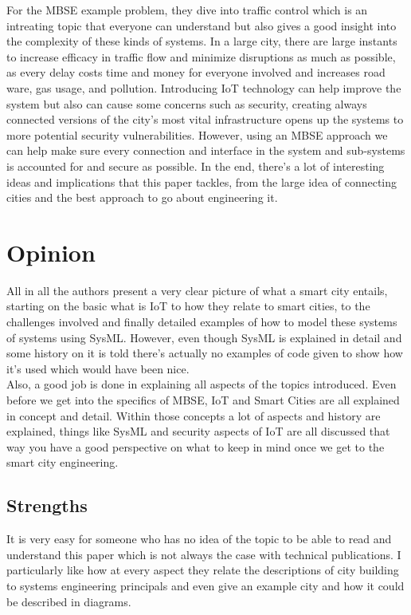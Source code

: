 \documentclass[11pt]{asme2ej}
\begin{document}
For the MBSE example problem, they dive into traffic control which is an intreating topic that everyone can understand but also gives a good insight into the complexity of these kinds of systems. 
In a large city, there are large instants to increase efficacy in traffic flow and minimize disruptions as much as possible, as every delay costs time and money for everyone involved and increases road ware, gas usage, and pollution. 
Introducing IoT technology can help improve the system but also can cause some concerns such as security, creating always connected versions of the city's most vital infrastructure opens up the systems to more potential security vulnerabilities.
However, using an MBSE approach we can help make sure every connection and interface in the system and sub-systems is accounted for and secure as possible.
In the end, there's a lot of interesting ideas and implications that this paper tackles, from the large idea of connecting cities and the best approach to go about engineering it.


\section{Opinion}

All in all the authors present a very clear picture of what a smart city entails, starting on the basic what is IoT to how they relate to smart cities, to the challenges involved and finally detailed examples of how to model these systems of systems using SysML.
However, even though SysML is explained in detail and some history on it is told there's actually no examples of code given to show how it's used which would have been nice.\\

Also, a good job is done in explaining all aspects of the topics introduced. 
Even before we get into the specifics of MBSE, IoT and Smart Cities are all explained in concept and detail.
Within those concepts a lot of aspects and history are explained, things like SysML and security aspects of IoT are all discussed that way you have a good perspective on what to keep in mind once we get to the smart city engineering.


\subsection{Strengths}

It is very easy for someone who has no idea of the topic to be able to read and understand this paper which is not always the case with technical publications. 
I particularly like how at every aspect they relate the descriptions of city building to systems engineering principals and even give an example city and how it could be described in diagrams.\\
\end{document}
